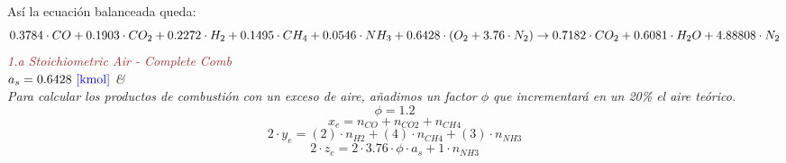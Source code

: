 \documentclass{article}
\theoremstyle{mytheoremstyle}
\theoremstyle{mytheoremstyle}
\theoremstyle{myproblemstyle}
\begin{document}
        {\color{blue} \rm Así la ecuación balanceada queda:}
        \begin{equation}
            \scriptsize 0.3784\cdot CO + 0.1903 \cdot CO_2 + 0.2272\cdot H_2 + 0.1495 \cdot CH_4 + 0.0546 \cdot NH_3 + 0.6428\cdot (O_2 + 3.76\cdot N_2) \rightarrow 0.7182\cdot CO_2 + 0.6081 \cdot H_2O + 4.88808 \cdot N_2
        \end{equation}
        \it \textcolor{brown}{1.a Stoichiometric Air - Complete Comb} \\
${a_{s} =0.6428 \rm\ {\color{blue} \left[kmol\right]}}$ & 
\it \textcolor{brown}{} \\
Para calcular los productos de combustión con un exceso de aire, añadimos un factor \(\phi\) que incrementará en un 20\% el aire teórico.
\begin{equation}
    \label{EES Eqn:18}
    \phi = 1.2 
    \end{equation}
    \begin{equation}
    \label{EES Eqn:19}
    x_{e} = n_{CO} + n_{CO2} + n_{CH4} 
    \end{equation}
    \begin{equation}
    \label{EES Eqn:20}
    2\cdot y_{e} =  \left( 2 \right) \cdot n_{H2} +  \left( 4 \right) \cdot n_{CH4} +  \left( 3 \right) \cdot n_{NH3} 
    \end{equation}
    \begin{equation}
    \label{EES Eqn:21}
    2\cdot z_{e} = 2\cdot  3.76 \cdot  \phi \cdot  a_{s} + 1 \cdot  n_{NH3} 
    \end{equation}
    
\end{document}
